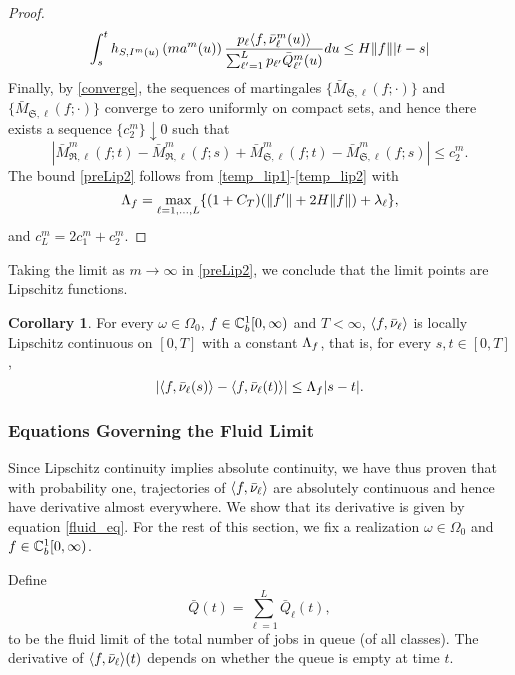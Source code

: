 \documentclass{article}
\theoremstyle{definition}
\newtheorem{corollary}[theorem]{Corollary}
\numberwithin{equation}{section}
\begin{document}
\begin{proof}
\begin{equation}
\int_s^t h_{S,I^m(u)}\left(ma^m(u)\right)\frac{p_\ell \langle f,\bar{\nu}^m_\ell(u)\rangle }{\sum_{\ell'=1}^Lp_{\ell'}\bar {Q}^m_{\ell'}(u)} du \leq H\|f\||t-s|
\end{equation}
Finally, by \eqref{converge}, the sequences of martingales $\{\bar M_{\mathfrak{S},\ell}(f;\cdot)\}$ and $\{\bar M_{\mathfrak{S},\ell}(f;\cdot)\}$ converge to zero uniformly on compact sets, and hence there exists a sequence $\{c_2^m\}\downarrow 0$ such that
\begin{equation}\label{temp_lip2}
  |\bar M^m_{\mathfrak{R},\ell}(f;t)-\bar M^m_{\mathfrak{R},\ell}(f;s)+\bar M^m_{\mathfrak{S},\ell}(f;t)-\bar M^m_{\mathfrak{S},\ell}(f;s)| \leq c_2^m.
\end{equation}
The bound \eqref{preLip2} follows from \eqref{temp_lip1}-\eqref{temp_lip2} with
\[\Lambda_f=\max_{\ell=1,...,L}\{(1+C_T)(\|f'\|+2H\|f\|)+\lambda_\ell\},\]
and $c_L^m=2c_1^m+c_2^m$.
\end{proof}

Taking the limit as $m\to\infty$ in \eqref{preLip2}, we conclude that the limit points are Lipschitz functions.
\begin{corollary}\label{cor_lipschitz}
For every $\omega\in\Omega_0$, $f\in\mathbb{C}_b^{1}[0,\infty)$ and $T<\infty$, $\langle f,\bar{\nu}_\ell \rangle $ is locally Lipschitz continuous on $[0,T]$ with a constant $\Lambda_f$, that is, for every $s,t\in[0,T]$,
\begin{equation}\label{lip}
    \left| \langle f, \bar{\nu}_\ell(s) \rangle -\langle f, \bar{\nu}_\ell(t) \rangle \right| \leq \Lambda_f|s-t|.
\end{equation}

\end{corollary}

\subsubsection{Equations Governing the Fluid Limit}

Since Lipschitz continuity implies absolute continuity, we have thus proven that with probability one, trajectories of $\langle f, \bar{\nu}_\ell \rangle$ are absolutely continuous and hence have derivative almost everywhere. We show that its derivative is given by equation \eqref{fluid_eq}. For the rest of this section, we fix a realization $\omega\in\Omega_0$ and $f\in\mathbb{C}_b^{1}[0,\infty)$.

Define
\[
\bar Q(t)= \sum_{\ell=1}^L \bar Q_\ell(t),
\]
to be the fluid limit of the total number of jobs in queue (of all classes). The derivative of $\langle f, \bar{\nu}_\ell \rangle(t)$ depends on whether the queue is empty at time $t$.
\end{document}
